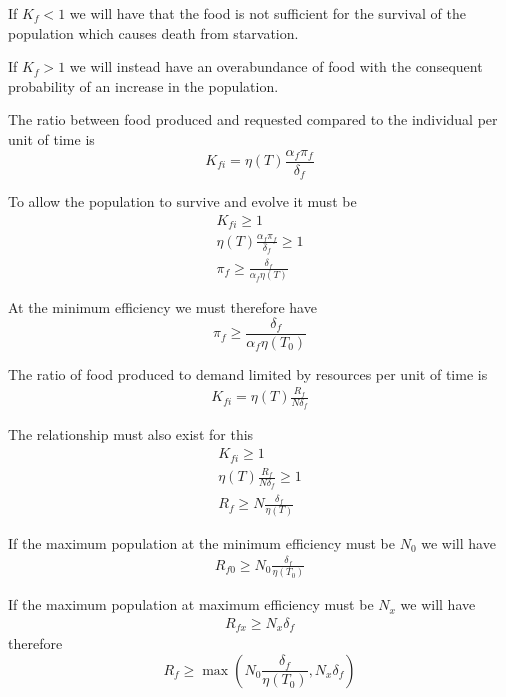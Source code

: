 \documentclass[a4paper,twoside]{article}
\begin{document}
If $ K_f<1 $ we will have that the food is not sufficient for the survival of the population which causes death from starvation.

If $ K_f> 1$ we will instead have an overabundance of food with the consequent probability of an increase in the population.

The ratio between food produced and requested compared to the individual per unit of time is
\begin{equation*}
	K_{fi} = \eta(T) \frac{\alpha_f \pi_f}{\delta_f}
\end{equation*}

To allow the population to survive and evolve it must be
\begin{align*}
	K_{fi} \ge 1
	\\
	\eta(T) \frac{\alpha_f \pi_f}{\delta_f} \ge 1
	\\
	\pi_f \ge \frac{\delta_f}{\alpha_f \eta(T)}
\end{align*}

At the minimum efficiency we must therefore have
\begin{equation} \label{eq:pif}
	\pi_f \ge \frac{\delta_f}{\alpha_f \eta(T_0)}
\end{equation}

The ratio of food produced to demand limited by resources per unit of time is
\begin{align*}
	K_{fi} = \eta(T) \frac{R_f}{N \delta_f}
\end{align*}

The relationship must also exist for this
\begin{align*}
	K_{fi} \ge 1
	\\
	\eta(T) \frac{R_f}{N \delta_f} \ge 1
	\\
	R_f \ge N \frac{\delta_f}{\eta(T)}
\end{align*}

If the maximum population at the minimum efficiency must be $ N_0 $ we will have
\begin{align*}
	R_{f0} \ge N_0 \frac{\delta_f}{\eta(T_0)}
\end{align*}

If the maximum population at maximum efficiency must be $ N_x $ we will have
\begin{align*}
	R_{fx} \ge N_x \delta_f
\end{align*}
therefore
\begin{equation}\label{eq:Rf}
	R_f \ge \max \left(N_0 \frac{\delta_f}{\eta(T_0)}, N_x \delta_f \right)
\end{equation}
\end{document}

